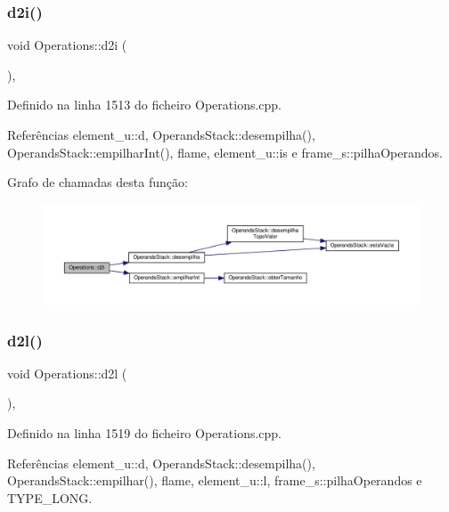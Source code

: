 \subsubsection{\texorpdfstring{d2i()}{d2i()}}
{\footnotesize\ttfamily void Operations\+::d2i (\begin{DoxyParamCaption}{ }\end{DoxyParamCaption})\hspace{0.3cm}{\ttfamily [static]}, {\ttfamily [private]}}



Definido na linha 1513 do ficheiro Operations.\+cpp.



Referências element\+\_\+u\+::d, Operands\+Stack\+::desempilha(), Operands\+Stack\+::empilhar\+Int(), flame, element\+\_\+u\+::is e frame\+\_\+s\+::pilha\+Operandos.

Grafo de chamadas desta função\+:
\nopagebreak
\begin{figure}[H]
\begin{center}
\leavevmode
\includegraphics[width=350pt]{classOperations_aa8cda1c04343e047078b72b51c575e1c_cgraph}
\end{center}
\end{figure}
\mbox{\label{classOperations_a2babf3c9e2ac30a70a07f8d43b32440a}} 
\subsubsection{\texorpdfstring{d2l()}{d2l()}}
{\footnotesize\ttfamily void Operations\+::d2l (\begin{DoxyParamCaption}{ }\end{DoxyParamCaption})\hspace{0.3cm}{\ttfamily [static]}, {\ttfamily [private]}}



Definido na linha 1519 do ficheiro Operations.\+cpp.



Referências element\+\_\+u\+::d, Operands\+Stack\+::desempilha(), Operands\+Stack\+::empilhar(), flame, element\+\_\+u\+::l, frame\+\_\+s\+::pilha\+Operandos e T\+Y\+P\+E\+\_\+\+L\+O\+NG.

